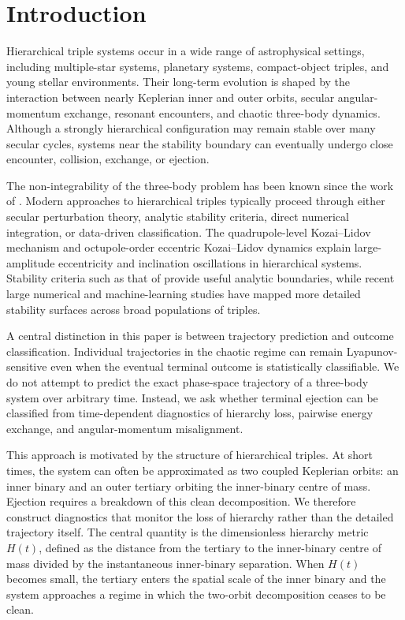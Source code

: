 \documentclass[12pt,a4paper]{article}
\begin{document}
\section{Introduction}
\label{sec:introduction}

Hierarchical triple systems occur in a wide range of astrophysical settings, including multiple-star systems, planetary systems, compact-object triples, and young stellar environments. Their long-term evolution is shaped by the interaction between nearly Keplerian inner and outer orbits, secular angular-momentum exchange, resonant encounters, and chaotic three-body dynamics. Although a strongly hierarchical configuration may remain stable over many secular cycles, systems near the stability boundary can eventually undergo close encounter, collision, exchange, or ejection.

The non-integrability of the three-body problem has been known since the work of \citet{Poincare1890}. Modern approaches to hierarchical triples typically proceed through either secular perturbation theory, analytic stability criteria, direct numerical integration, or data-driven classification. The quadrupole-level Kozai--Lidov mechanism \citep{Kozai1962,Lidov1962} and octupole-order eccentric Kozai--Lidov dynamics \citep{Ford2000,Lithwick2011,Naoz2011,Naoz2012,Liu2015,Petrovich2015} explain large-amplitude eccentricity and inclination oscillations in hierarchical systems. Stability criteria such as that of \citet{Mardling2001} provide useful analytic boundaries, while recent large numerical and machine-learning studies have mapped more detailed stability surfaces across broad populations of triples.

A central distinction in this paper is between trajectory prediction and outcome classification. Individual trajectories in the chaotic regime can remain Lyapunov-sensitive even when the eventual terminal outcome is statistically classifiable. We do not attempt to predict the exact phase-space trajectory of a three-body system over arbitrary time. Instead, we ask whether terminal ejection can be classified from time-dependent diagnostics of hierarchy loss, pairwise energy exchange, and angular-momentum misalignment.

This approach is motivated by the structure of hierarchical triples. At short times, the system can often be approximated as two coupled Keplerian orbits: an inner binary and an outer tertiary orbiting the inner-binary centre of mass. Ejection requires a breakdown of this clean decomposition. We therefore construct diagnostics that monitor the loss of hierarchy rather than the detailed trajectory itself. The central quantity is the dimensionless hierarchy metric \(H(t)\), defined as the distance from the tertiary to the inner-binary centre of mass divided by the instantaneous inner-binary separation. When \(H(t)\) becomes small, the tertiary enters the spatial scale of the inner binary and the system approaches a regime in which the two-orbit decomposition ceases to be clean.
\end{document}
